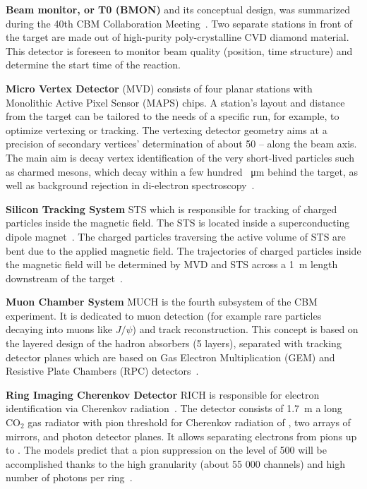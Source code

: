 \textbf{Beam monitor, or T0 (\gls{BMON})} and its conceptual design, was summarized during the 40th \gls{CBM} Collaboration Meeting~\cite{bmon}. Two separate stations in front of the target are made out of high-purity poly-crystalline CVD diamond material. This detector is foreseen to monitor beam quality (position, time structure) and determine the start time of the reaction.\bigbreak

\textbf{Micro Vertex Detector} (\gls{MVD}) consists of four planar stations with Monolithic Active Pixel Sensor (\gls{MAPS}) chips. A station's layout and distance from the target can be tailored to the needs of a specific run, for example, to optimize vertexing or tracking. The vertexing detector geometry aims at a precision of secondary vertices' determination of about 50 --  along the beam axis. The main aim is decay vertex identification of the very short-lived particles such as charmed mesons, which decay within a few hundred \SI{}{\micro\metre} behind the target, as well as background rejection in di-electron spectroscopy~\cite{MVD}.\bigbreak

 \textbf{Silicon Tracking System} \gls{STS} which is responsible for tracking of charged particles inside the magnetic field. The \gls{STS} is located inside a superconducting dipole magnet~\cite{Malakhov:109025}. The charged particles traversing the active volume of \gls{STS} are bent due to the applied magnetic field. The trajectories of charged particles inside the magnetic field will be determined by MVD and STS across a \SI{1}{\metre} length downstream of the target~\cite{Heuser:54798}.\bigbreak
 
\textbf{Muon Chamber System} \gls{MUCH} is the fourth subsystem of the \gls{CBM} experiment. It is dedicated to muon detection (for example rare particles decaying into muons like $J/\psi$) and track reconstruction. This concept is based on the layered design of the hadron absorbers (5 layers), separated with tracking detector planes which are based on Gas Electron Multiplication (\gls{GEM}) and Resistive Plate Chambers (\gls{RPC}) detectors~\cite{MUCH}.\bigbreak

\textbf{Ring Imaging Cherenkov Detector} \gls{RICH} is responsible for electron identification via Cherenkov radiation~\cite{RICH}. The detector consists of \SI{1.7}{\metre} a long $\mathrm{CO_{2}}$ gas radiator with pion threshold for Cherenkov radiation of , two arrays of mirrors, and photon detector planes. It allows separating electrons from pions up to . The models predict that a pion suppression on the level of 500 will be accomplished thanks to the high granularity (about 55 000 channels) and high number of photons per ring~\cite{RICH}.\bigbreak

